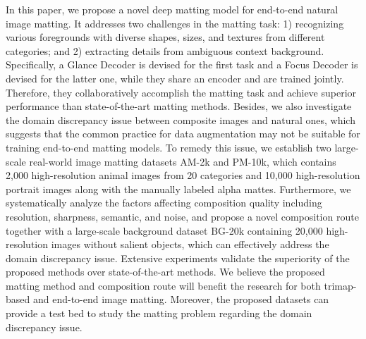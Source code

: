\documentclass[twocolumn]{svjour3}
\begin{document}
In this paper, we propose a novel deep matting model for end-to-end natural image matting. It addresses two challenges in the matting task: 1) recognizing various foregrounds with diverse shapes, sizes, and textures from different categories; and 2) extracting details from ambiguous context background. Specifically, a Glance Decoder is devised for the first task and a Focus Decoder is devised for the latter one, while they share an encoder and are trained jointly. Therefore, they collaboratively accomplish the matting task and achieve superior performance than state-of-the-art matting methods. Besides, we also investigate the domain discrepancy issue between composite images and natural ones, which suggests that the common practice for data augmentation may not be suitable for training end-to-end matting models. To remedy this issue, we establish two large-scale real-world image matting datasets AM-2k and PM-10k, which contains 2,000 high-resolution animal images from 20 categories and 10,000 high-resolution portrait images along with the manually labeled alpha mattes. Furthermore, we systematically analyze the factors affecting composition quality including resolution, sharpness, semantic, and noise, and propose a novel composition route together with a large-scale background dataset BG-20k containing 20,000 high-resolution images without salient objects, which can effectively address the domain discrepancy issue. Extensive experiments validate the superiority of the proposed methods over state-of-the-art methods. We believe the proposed matting method and composition route will benefit the research for both trimap-based and end-to-end image matting. Moreover, the proposed datasets can provide a test bed to study the matting problem regarding the domain discrepancy issue.
\end{document}
